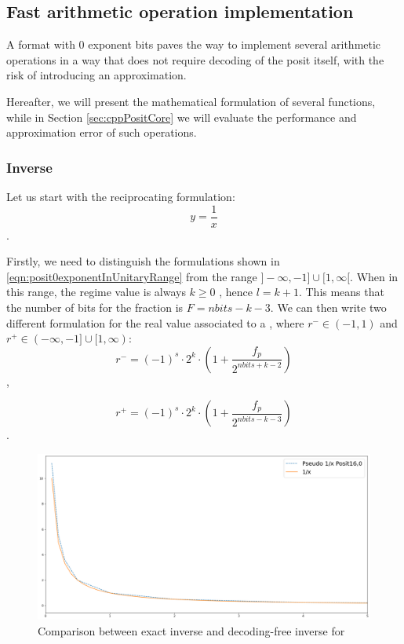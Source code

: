 \subsection{Fast arithmetic operation implementation
}\label{subsec:fastArithOps}

A format with $0$ exponent bits paves the way to implement several arithmetic operations in a way that does not require decoding of the posit itself, with the risk of introducing an approximation.

Hereafter, we will present the mathematical formulation of several functions, while in Section \ref{sec:cppPositCore} we will evaluate the performance and approximation error of such operations.

\subsubsection{Inverse}
 
Let us start with the reciprocating formulation:
\begin{equation}
    y = \frac{1}{x}
\end{equation}.

Firstly, we need to distinguish the formulations shown in \eqref{eqn:posit0exponentInUnitaryRange} from the range  $]-\infty,-1] \cup [1,\infty[$. When in this range, the regime value is always $k \geq 0$ ,  hence $l = k + 1$. This means that the number of bits for the fraction is $F = nbits - k - 3$. We can then write two different formulation for the real value associated to a , where $r^- \in (-1,1)$ and $r^+ \in (-\infty, -1] \cup [1,\infty)$:
\begin{equation}
   r^- =  (-1)^s \cdot 2^k \cdot \left ( 1 + \frac{f_p}{2^{nbits + k - 2}} \right )
\end{equation},

\begin{equation}
   r^+ = (-1)^s \cdot 2^k \cdot \left ( 1 + \frac{f_p}{2^{nbits - k - 3}} \right )
\end{equation}.


\begin{figure}
    \centering
    \includegraphics[width=\linewidth]{img/invPosit160.png}
    \caption{Comparison between exact inverse and decoding-free inverse for }
    \label{fig:invPosit160}
\end{figure}

